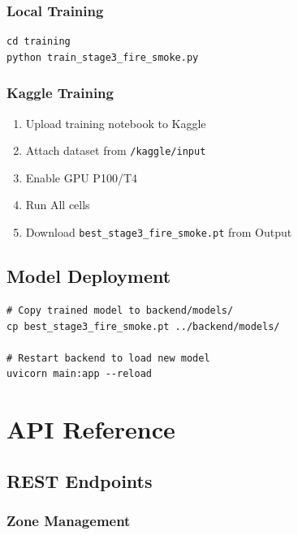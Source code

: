 \documentclass[12pt,a4paper,oneside]{book}
\begin{document}
\subsection{Local Training}

\begin{verbatim}
cd training
python train_stage3_fire_smoke.py
\end{verbatim}

\subsection{Kaggle Training}

\begin{enumerate}
    \item Upload training notebook to Kaggle
    \item Attach dataset from \texttt{/kaggle/input}
    \item Enable GPU P100/T4
    \item Run All cells
    \item Download \texttt{best\_stage3\_fire\_smoke.pt} from Output
\end{enumerate}

\section{Model Deployment}

\begin{verbatim}
# Copy trained model to backend/models/
cp best_stage3_fire_smoke.pt ../backend/models/

# Restart backend to load new model
uvicorn main:app --reload
\end{verbatim}

\chapter{API Reference}

\section{REST Endpoints}

\subsection{Zone Management}
\end{document}

